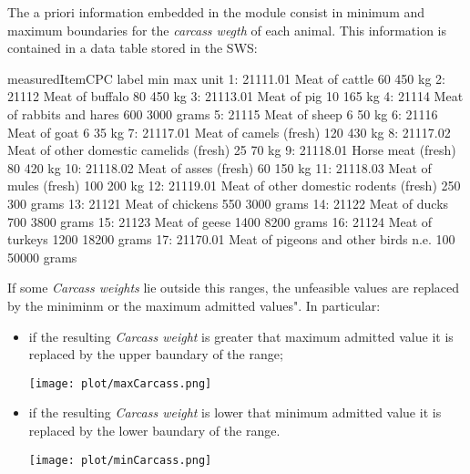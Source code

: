 \documentclass[nojss]{jss}
\begin{document}
The a priori information embedded in the module consist in minimum and maximum boundaries for the \textit{carcass wegth} of each animal.
This information is contained in a data table stored in the SWS:

\begin{Schunk}
\begin{Soutput}
    measuredItemCPC                                   label  min   max  unit
 1:        21111.01                          Meat of cattle   60   450    kg
 2:           21112                         Meat of buffalo   80   450    kg
 3:        21113.01                             Meat of pig   10   165    kg
 4:           21114               Meat of rabbits and hares  600  3000 grams
 5:           21115                           Meat of sheep    6    50    kg
 6:           21116                            Meat of goat    6    35    kg
 7:        21117.01                  Meat of camels (fresh)  120   430    kg
 8:        21117.02 Meat of other domestic camelids (fresh)   25    70    kg
 9:        21118.01                      Horse meat (fresh)   80   420    kg
10:        21118.02                   Meat of asses (fresh)   60   150    kg
11:        21118.03                   Meat of mules (fresh)  100   200    kg
12:        21119.01  Meat of other domestic rodents (fresh)  250   300 grams
13:           21121                        Meat of chickens  550  3000 grams
14:           21122                           Meat of ducks  700  3800 grams
15:           21123                           Meat of geese 1400  8200 grams
16:           21124                         Meat of turkeys 1200 18200 grams
17:        21170.01    Meat of pigeons and other birds n.e.  100 50000 grams
\end{Soutput}
\end{Schunk}

If some \textit{Carcass weights} lie outside this ranges, the unfeasible values are replaced by the miniminm or the maximum admitted values". In particular:

\begin{itemize}
\item{if the resulting \textit{Carcass weight} is greater that maximum admitted value it is replaced by the upper baundary of the range;

\begin{center}
\texttt{[image: plot/maxCarcass.png]}
\end{center}
}
\item{if the resulting \textit{Carcass weight} is lower that minimum admitted value it is replaced by the lower baundary of the range.
\begin{center}
\texttt{[image: plot/minCarcass.png]}
\end{center}}
\end{itemize}
\end{document}
